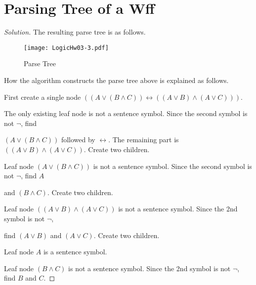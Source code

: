 \documentclass{article}
\newenvironment{solution}{\begin{proof}[\noindent\it Solution]}{\end{proof}}
\begin{document}
\vspace{1em}
\section{Parsing Tree of a Wff}
\vspace{1em}
\begin{solution}
    The resulting parse tree is as follows.

    \begin{figure}[htbp]
    	\centering
    	{\texttt{[image: LogicHw03-3.pdf]}}
        \caption{Parse Tree}
    \end{figure}

    \vspace{-0.5em} \hspace{2.6em}
    How the algorithm constructs the parse tree above is explained as follows.
    
    \hspace{2.6em}
    First create a single node $\left(\left(A\lor\left(B\land C\right)\right)\leftrightarrow\left(\left(A\lor B\right)\land\left(A\lor C\right)\right)\right)$.

    \hspace{2.6em}
    The only existing leaf node is not a sentence symbol. Since the second symbol is not $\neg$, 
    find 
    
    $\left(A\lor\left(B\land C\right)\right)$ followed by $\leftrightarrow$. The remaining part is $\left(\left(A\lor B\right)\land\left(A\lor C\right)\right)$. Create two children.

    \hspace{2.6em}
    Leaf node $\left(A\lor\left(B\land C\right)\right)$ is not a sentence symbol. Since the second symbol is not $\neg$, find $A$ 
    
    and $\left(B\land C\right)$. Create two children.

    \hspace{2.6em}
    Leaf node $\left(\left(A\lor B\right)\land\left(A\lor C\right)\right)$ is not a sentence symbol. Since the 2nd symbol is not $\neg$, 
    
    find $\left(A\lor B\right)$ and $\left(A\lor C\right)$. Create two children.

    \hspace{2.6em}
    Leaf node $A$ is a sentence symbol.

    \hspace{2.6em}
    Leaf node $\left(B\land C\right)$ is not a sentence symbol. Since the 2nd symbol is not $\neg$, find $B$ and $C$. 
    

\end{solution}
\end{document}
